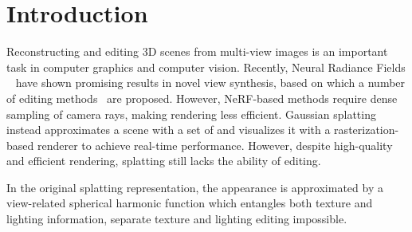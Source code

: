 \section{Introduction}
\label{sec:intro}

Reconstructing and editing 3D scenes from multi-view images is an important task in computer graphics and computer vision. 
Recently, Neural Radiance Fields ~\cite{NeRF} have shown promising results in novel view synthesis, based on which a number of editing methods~\cite{NeuMesh, NeuTex, EditNeRF, DE-NeRF} are proposed. 
However, NeRF-based methods require dense sampling of camera rays, making rendering less efficient. 
Gaussian splatting~\cite{GS} instead approximates a scene with a set of  and visualizes it with a rasterization-based renderer to achieve real-time performance. 
However, despite high-quality and efficient rendering,  splatting still lacks the ability of editing. 


In the original  splatting representation, the appearance is approximated by a view-related spherical harmonic function which entangles both texture and lighting information,  separate texture and lighting editing impossible. 









